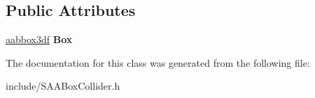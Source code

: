 \subsection*{Public Attributes}
\begin{DoxyCompactItemize}
\item 
\hyperlink{namespaceirr_1_1core_adfc8fa01b30044c55f3332a1d6c1aa19}{aabbox3df} {\bfseries Box}\hypertarget{classirr_1_1core_1_1SAABoxCollider_a3090bb9fd310346c5482174da7a43119}{}\label{classirr_1_1core_1_1SAABoxCollider_a3090bb9fd310346c5482174da7a43119}

\end{DoxyCompactItemize}


The documentation for this class was generated from the following file\+:\begin{DoxyCompactItemize}
\item 
include/S\+A\+A\+Box\+Collider.\+h\end{DoxyCompactItemize}
